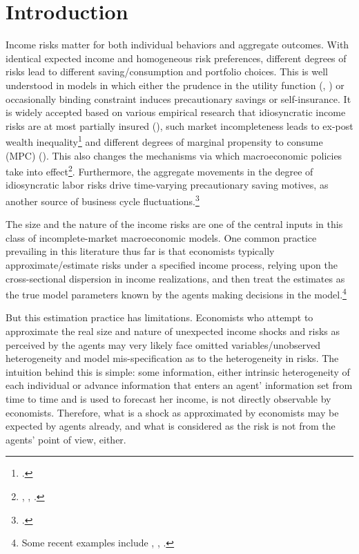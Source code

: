 
    \hypertarget{introduction}{%
\section{Introduction}\label{introduction}}

Income risks matter for both individual behaviors and aggregate
outcomes. With identical expected income and homogeneous risk
preferences, different degrees of risks lead to different
saving/consumption and portfolio choices. This is well understood in
models in which either the prudence in the utility function
(\cite{kimball1990precautionary}, \cite{carroll2001liquidity}) or occasionally binding constraint induces precautionary
savings or self-insurance. It is widely accepted based on various empirical research that
idiosyncratic income risks are at most partially insured
(\cite{blundell_consumption_2008}), such market incompleteness leads
to ex-post wealth inequality\footnote{\cite{ aiyagari1994uninsured,huggett1996wealth,carroll1997nature,krusell1998income}.} and different degrees of marginal
propensity to consume (MPC) (\cite{krueger2016macroeconomics, carroll2017distribution}). This also changes the mechanisms via which macroeconomic policies take into effect\footnote{\cite{krueger2016macroeconomics}, \cite{kaplan2018monetary}, \cite{auclert2019monetary}.}. Furthermore, the aggregate movements in the degree of idiosyncratic labor risks drive time-varying precautionary saving motives, as another source of business cycle fluctuations.\footnote{ \cite{challe2016precautionary, mckay2017time,heathcote2018wealth, kaplan2018microeconomic,den2018unemployment,bayer2019precautionary, acharya2020understanding,ravn2021macroeconomic}.}

The size and the nature of the income risks are one of the central inputs in this class of incomplete-market macroeconomic models. One common practice prevailing in this literature thus far is that economists typically approximate/estimate risks under a specified income process, relying upon the cross-sectional dispersion in income realizations, and then treat the estimates
as the true model parameters known by the agents making decisions in the
model.\footnote{Some recent examples include \cite{krueger2016macroeconomics}, \cite{bayer2019precautionary}, \cite{kaplan2018monetary}.}
  
  
But this estimation practice has limitations. Economists who attempt to approximate the real size and nature of unexpected income shocks and risks as perceived by the agents may very likely face omitted variables/unobserved heterogeneity and model mis-specification as to the heterogeneity in risks. The intuition behind this is simple: some information, either intrinsic heterogeneity of each individual or advance information that enters an agent' information set from time to time and is used to forecast her income, is not directly observable by economists. Therefore, what is a shock as approximated by economists may be expected by agents already, and what is considered as the risk is not from the agents' point of view, either.



